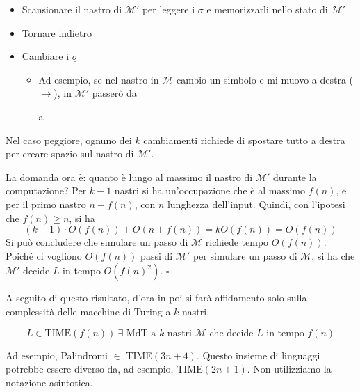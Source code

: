 \begin{itemize}
    \item Scansionare il nastro di $\mathcal{M}'$ per leggere i $\underline{\sigma}$ e memorizzarli nello stato di $\mathcal{M}'$
    \item Tornare indietro
    \item Cambiare i $\underline{\sigma}$
    \begin{itemize}
        \item Ad esempio, se nel nastro in $\mathcal{M}$ cambio un simbolo e mi muovo a destra ($\to$), in $\mathcal{M}'$ passerò da 
        a 
    \end{itemize}
\end{itemize} 
Nel caso peggiore, ognuno dei $k$ cambiamenti richiede di spostare tutto a destra per creare spazio sul nastro di $\mathcal{M}'$. 

La domanda ora è: quanto è lungo al massimo il nastro di $\mathcal{M}'$ durante la computazione? Per $k-1$ nastri si ha un'occupazione che è al massimo $f(n)$, e per il primo nastro $n+f(n)$, con $n$ lunghezza dell'input. Quindi, con l'ipotesi che $f(n)\geq n$, si ha 
$$
(k-1)\cdot O(f(n)) + O(n+f(n)) = kO(f(n)) = O(f(n))
$$
Si può concludere che simulare un passo di $\mathcal{M}$ richiede tempo $O(f(n))$. Poiché ci vogliono $O(f(n))$ passi di $\mathcal{M}'$ per simulare un passo di $\mathcal{M}$, si ha che $\mathcal{M}'$ decide $L$ in tempo $O(f(n)^2)$. \hfill $\square$\medskip

A seguito di questo risultato, d'ora in poi si farà affidamento solo sulla complessità delle macchine di Turing a $k$-nastri.

\begin{definition}
    $$
        L\in\text{TIME}(f(n)) ~ \exists \text{ MdT a } k \text{-nastri } \mathcal{M} \text{ che decide } L \text{ in tempo } f(n)
    $$
\end{definition}
Ad esempio, Palindromi $\in$ TIME$(3n+4)$. Questo insieme di linguaggi potrebbe essere diverso da, ad esempio, TIME$(2n+1)$. Non utilizziamo la notazione asintotica.

